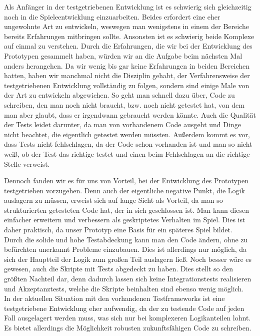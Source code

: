 Als Anfänger in der testgetriebenen Entwicklung ist es schwierig sich gleichzeitig noch in die Spieleentwicklung einzuarbeiten. Beides erfordert eine eher ungewohnte Art zu entwickeln, weswegen man wenigstens in einem der Bereiche bereits Erfahrungen mitbringen sollte. Ansonsten ist es schwierig beide Komplexe auf einmal zu verstehen. Durch die Erfahrungen, die wir bei der Entwicklung des Prototypen gesammelt haben, würden wir an die Aufgabe beim nächsten Mal anders herangehen. Da wir wenig bis gar keine Erfahrungen in beiden Bereichen hatten, haben wir manchmal nicht die Disziplin gehabt, der Verfahrensweise der testgetriebenen Entwicklung vollständig zu folgen, sondern sind einige Male von der Art zu entwickeln abgewichen. So geht man schnell dazu über, Code zu schreiben, den man noch nicht braucht, bzw. noch nicht getestet hat, von dem man aber glaubt, dass er irgendwann gebraucht werden könnte. Auch die Qualität der Tests leidet darunter, da man von vorhandenem Code ausgeht und Dinge nicht beachtet, die eigentlich getestet werden müssten. Außerdem kommt es vor, dass Tests nicht fehlschlagen, da der Code schon vorhanden ist und man so nicht weiß, ob der Test das richtige testet und einen beim Fehlschlagen an die richtige Stelle verweist.

Dennoch fanden wir es für uns von Vorteil, bei der Entwicklung des Prototypen testgetrieben vorzugehen. Denn auch der eigentliche negative Punkt, die Logik auslagern zu müssen, erweist sich auf lange Sicht als Vorteil, da man so strukturierten getesteten Code hat, der in sich geschlossen ist. Man kann diesen einfacher erweitern und verbessern als geskriptetes Verhalten im Spiel. Dies ist daher praktisch, da unser Prototyp eine Basis für ein späteres Spiel bildet. \\
Durch die solide und hohe Testabdeckung kann man den Code ändern, ohne zu befürchten unerkannt Probleme einzubauen. Dies ist allerdings nur möglich, da sich der Hauptteil der Logik zum großen Teil auslagern ließ. Noch besser wäre es gewesen, auch die Skripte mit Tests abgedeckt zu haben. Dies stellt so den größten Nachteil dar, denn dadurch lassen sich keine Integrationstests realisieren und Akzeptanztests, welche die Skripte beinhalten sind ebenso wenig möglich.\\
In der aktuellen Situation mit den vorhandenen Testframeworks ist eine testgetriebene Entwicklung eher aufwendig, da der zu testende Code auf jeden Fall ausgelagert werden muss, was sich nur bei komplexeren Logikanteilen lohnt. Es bietet allerdings die Möglichkeit robusten zukunftsfähigen Code zu schreiben.